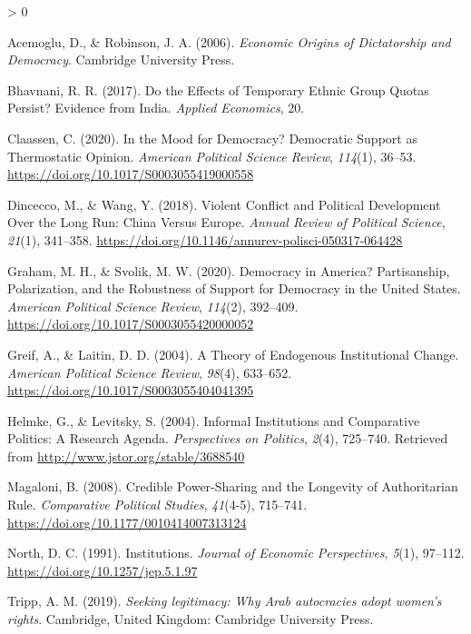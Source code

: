 \documentclass[
  english,
  man]{apa6}
\newlength{\cslhangindent}
\newenvironment{CSLReferences}[2] %
 {%
  \setlength{\parindent}{0pt}
  \ifodd #1 \everypar{\setlength{\hangindent}{\cslhangindent}}\ignorespaces\fi
  \ifnum #2 > 0
  \setlength{\parskip}{#2\baselineskip}
  \fi
 }%
 {}
\begin{document}
\hypertarget{refs}{}
\begin{CSLReferences}{1}{0}
\leavevmode\hypertarget{ref-acemoglu2006}{}%
Acemoglu, D., \& Robinson, J. A. (2006). \emph{Economic {Origins} of {Dictatorship} and {Democracy}}. Cambridge University Press.

\leavevmode\hypertarget{ref-bhavnani2017}{}%
Bhavnani, R. R. (2017). Do the {Effects} of {Temporary} {Ethnic} {Group} {Quotas} {Persist}? {Evidence} from {India}. \emph{Applied Economics}, 20.

\leavevmode\hypertarget{ref-claassen2020}{}%
Claassen, C. (2020). In the {Mood} for {Democracy}? {Democratic} {Support} as {Thermostatic} {Opinion}. \emph{American Political Science Review}, \emph{114}(1), 36--53. \url{https://doi.org/10.1017/S0003055419000558}

\leavevmode\hypertarget{ref-dincecco2018}{}%
Dincecco, M., \& Wang, Y. (2018). Violent {Conflict} and {Political} {Development} {Over} the {Long} {Run}: {China} {Versus} {Europe}. \emph{Annual Review of Political Science}, \emph{21}(1), 341--358. \url{https://doi.org/10.1146/annurev-polisci-050317-064428}

\leavevmode\hypertarget{ref-graham2020}{}%
Graham, M. H., \& Svolik, M. W. (2020). Democracy in {America}? {Partisanship}, {Polarization}, and the {Robustness} of {Support} for {Democracy} in the {United} {States}. \emph{American Political Science Review}, \emph{114}(2), 392--409. \url{https://doi.org/10.1017/S0003055420000052}

\leavevmode\hypertarget{ref-greif2004}{}%
Greif, A., \& Laitin, D. D. (2004). A {Theory} of {Endogenous} {Institutional} {Change}. \emph{American Political Science Review}, \emph{98}(4), 633--652. \url{https://doi.org/10.1017/S0003055404041395}

\leavevmode\hypertarget{ref-helmke2004}{}%
Helmke, G., \& Levitsky, S. (2004). Informal {Institutions} and {Comparative} {Politics}: {A} {Research} {Agenda}. \emph{Perspectives on Politics}, \emph{2}(4), 725--740. Retrieved from \url{http://www.jstor.org/stable/3688540}

\leavevmode\hypertarget{ref-magaloni2008}{}%
Magaloni, B. (2008). Credible {Power}-{Sharing} and the {Longevity} of {Authoritarian} {Rule}. \emph{Comparative Political Studies}, \emph{41}(4-5), 715--741. \url{https://doi.org/10.1177/0010414007313124}

\leavevmode\hypertarget{ref-north1991}{}%
North, D. C. (1991). Institutions. \emph{Journal of Economic Perspectives}, \emph{5}(1), 97--112. \url{https://doi.org/10.1257/jep.5.1.97}

\leavevmode\hypertarget{ref-tripp2019}{}%
Tripp, A. M. (2019). \emph{Seeking legitimacy: Why {Arab} autocracies adopt women's rights}. Cambridge, United Kingdom: Cambridge University Press.

\end{CSLReferences}

\endgroup
\end{document}
